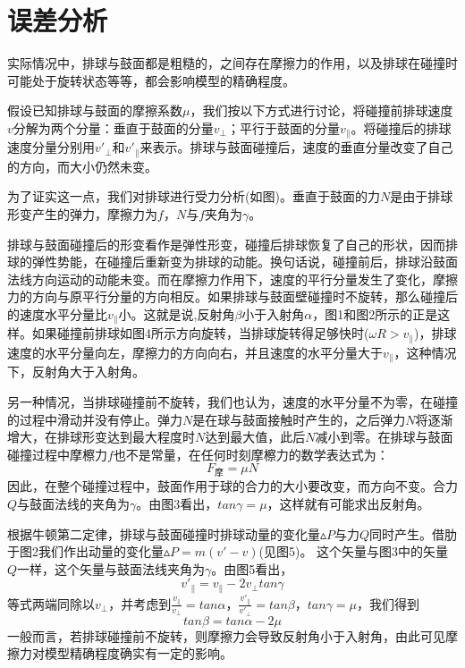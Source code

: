 \documentclass{cumcmthesis}
\begin{document}
\section{误差分析}

实际情况中，排球与鼓面都是粗糙的，之间存在摩擦力的作用，以及排球在碰撞时可能处于旋转状态等等，都会影响模型的精确程度。

假设已知排球与鼓面的摩擦系数$\mu$，我们按以下方式进行讨论，将碰撞前排球速度$v$分解为两个分量：垂直于鼓面的分量$v_\bot$；平行于鼓面的分量$v_\parallel$。将碰撞后的排球速度分量分别用$v'_\bot$和$v'_\parallel$来表示。排球与鼓面碰撞后，速度的垂直分量改变了自己的方向，而大小仍然未变。

为了证实这一点，我们对排球进行受力分析(如图)。垂直于鼓面的力$N$是由于排球形变产生的弹力，摩擦力为$f$，$N$与$f$夹角为$\gamma$。

排球与鼓面碰撞后的形变看作是弹性形变，碰撞后排球恢复了自己的形状，因而排球的弹性势能，在碰撞后重新变为排球的动能。换句话说，碰撞前后，排球沿鼓面法线方向运动的动能未变。而在摩擦力作用下，速度的平行分量发生了变化，摩擦力的方向与原平行分量的方向相反。如果排球与鼓面壁碰撞时不旋转，那么碰撞后的速度水平分量比$v_\parallel$小。这就是说,反射角$\beta$小于入射角$\alpha$，图1和图2所示的正是这样。如果碰撞前排球如图4所示方向旋转，当排球旋转得足够快时($\omega R>v_\parallel$)，排球速度的水平分量向左，摩擦力的方向向右，并且速度的水平分量大于$v_\parallel$，这种情况下，反射角大于入射角。

另一种情况，当排球碰撞前不旋转，我们也认为，速度的水平分量不为零，在碰撞的过程中滑动并没有停止。弹力$N$是在球与鼓面接触时产生的，之后弹力$N$将逐渐增大，在排球形变达到最大程度时$N$达到最大值，此后$N$减小到零。在排球与鼓面碰撞过程中摩檫力$f$也不是常量，在任何时刻摩檫力的数学表达式为：
\begin{equation*}
	F_\textrm{摩}=\mu N
\end{equation*}
因此，在整个碰撞过程中，鼓面作用于球的合力的大小要改变，而方向不变。合力$Q$与鼓面法线的夹角为$\gamma$。由图3看出，$tan\gamma=\mu$，这样就有可能求出反射角。

根据牛顿第二定律，排球与鼓面碰撞时排球动量的变化量$\vartriangle P$与力$Q$同时产生。借肋于图2我们作出动量的变化量$\vartriangle P=m(v'-v)$(见图5)。
这个矢量与图3中的矢量$Q$一样，这个矢量与鼓面法线夹角为$\gamma$。由图5看出，
\begin{equation*}
	v'_\parallel=v_\parallel-2v_\bot tan\gamma
\end{equation*}
等式两端同除以$v_\bot$，并考虑到$\frac{v_\parallel}{v_\bot}=tan\alpha$，$\frac{v'_\parallel}{v'_\bot}=tan\beta$，$tan\gamma=\mu$，我们得到
\begin{equation*}
	tan\beta=tan\alpha-2\mu
\end{equation*}
一般而言，若排球碰撞前不旋转，则摩擦力会导致反射角小于入射角，由此可见摩擦力对模型精确程度确实有一定的影响。
\end{document}
